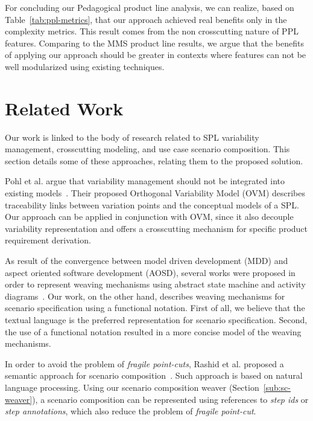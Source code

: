 \documentclass{acm_proc_article-sp}
\begin{document}
For concluding our Pedagogical product line analysis, we can realize, based on Table~\ref{tab:ppl-metrics}, that our approach achieved real benefits only in the complexity metrics. This result comes from the non crosscutting nature of PPL features. Comparing to the MMS product line results, we argue that the benefits of applying our approach should be greater in contexts where features can not be well modularized using existing techniques. 
   
\section{Related Work}
\label{sec:related}

Our work is linked to the body of research related to SPL
variability management, crosscutting modeling, and use case scenario
composition. This section details some of these approaches, relating
them to the proposed solution.

Pohl et al. argue that variability management should not be
integrated into existing models~\cite{phol-spl-book}. Their proposed
Orthogonal Variability Model (OVM) describes traceability links
between variation points and the conceptual models of a SPL. Our
approach can be applied in conjunction with OVM, since it also
decouple variability representation and offers a crosscutting
mechanism for specific product requirement derivation.

As result of the convergence between model driven development (MDD)
and aspect oriented software development (AOSD), several works were
proposed in order to represent weaving mechanisms using abstract
state machine and activity
diagrams~\cite{noda-aom-2006,thomas-aom-2006}. Our work, on the
other hand, describes weaving mechanisms for scenario specification
using a functional notation. First of all, we believe that the
textual language is the preferred representation for scenario
specification. Second, the use of a functional notation resulted in
a more concise model of the weaving mechanisms.

In order to avoid the problem of \emph{fragile point-cuts}, Rashid
et al. proposed a semantic approach for scenario
composition~\cite{rashid-aosd-2007}. Such approach is based on
natural language processing. Using our scenario composition weaver
(Section~\ref{sub:sc-weaver}), a scenario composition can be
represented using references to \emph{step ids} or \emph{step annotations}, 
which also reduce the problem of \emph{fragile point-cut}.
\end{document}
